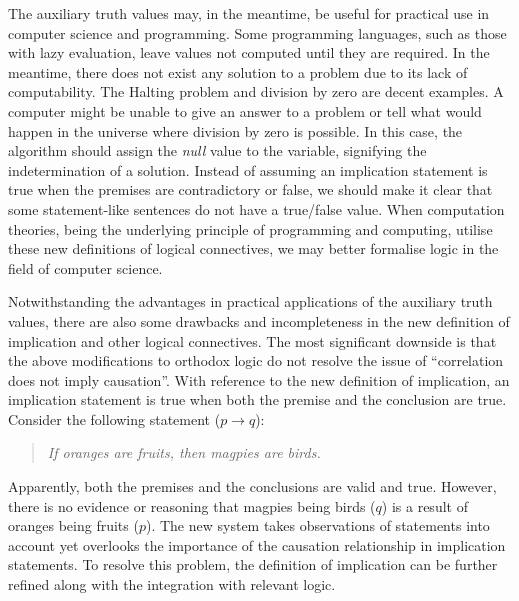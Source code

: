 \documentclass{article}
\begin{document}
The auxiliary truth values may, in the meantime, be useful for practical use in
computer science and programming. Some programming languages, such as those
with lazy evaluation, leave values not computed until they are required. In the
meantime, there does not exist any solution to a problem due to its lack of
computability. The Halting problem and division by zero are decent examples. A
computer might be unable to give an answer to a problem or tell what would
happen in the universe where division by zero is possible. In this case, the
algorithm should assign the \textit{null} value to the variable, signifying the
indetermination of a solution. Instead of assuming an implication statement is
true when the premises are contradictory or false, we should make it clear that
some statement-like sentences do not have a true/false value. When computation
theories, being the underlying principle of programming and computing, utilise
these new definitions of logical connectives, we may better formalise logic in
the field of computer science.

\bigskip

Notwithstanding the advantages in practical applications of the auxiliary truth
values, there are also some drawbacks and incompleteness in the new definition
of implication and other logical connectives. The most significant downside is
that the above modifications to orthodox logic do not resolve the issue of
``correlation does not imply causation''. With reference to the new definition
of implication, an implication statement is true when both the premise and the
conclusion are true. Consider the following statement ($p \to q$):

\begin{quote}
    \textit{If oranges are fruits, then magpies are birds.}
\end{quote}

Apparently, both the premises and the conclusions are valid and true. However,
there is no evidence or reasoning that magpies being birds ($q$) is a result of
oranges being fruits ($p$). The new system takes observations of statements into
account yet overlooks the importance of the causation relationship in
implication statements. To resolve this problem, the definition of implication
can be further refined along with the integration with relevant logic.

\bigskip
\end{document}
